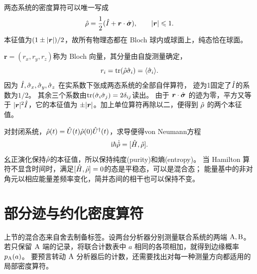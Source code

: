 两态系统的密度算符可以唯一写成
\begin{equation}
    \hat{\rho} = \frac12(\hat{I} + \bm r \cdot \hat{\bm{\sigma}}),\qquad \lvert\bm r\rvert \leqslant 1.
\end{equation}
本征值为$(1 \pm \lvert\bm r\rvert)/2$，故所有物理态都在 Bloch 球内或球面上，纯态恰在球面。

$\bm r = (r_x,r_y,r_z)$称为 Bloch 向量，其分量由自旋测量确定，
\begin{equation}
    r_i = \operatorname{tr}(\hat{\rho}\hat{\sigma}_i) = \langle\hat{\sigma}_i\rangle.
\end{equation}
因为 $\hat{I},\hat{\sigma}_x,\hat{\sigma}_y,\hat{\sigma}_z$ 在实系数下张成两态系统的全部自伴算符，
迹为1固定了$\hat{I}$的系数为$1/2$。
其余三个系数由$\operatorname{tr}(\hat{\sigma}_i\hat{\sigma}_j) = 2\delta_{ij}$读出。
由于 $\bm r \cdot \hat{\bm{\sigma}}$ 的迹为零，平方又等于 $\lvert\bm r\rvert^2\hat{I}$，它的本征值为 $\pm\lvert\bm r\rvert$。加上单位算符再除以二，便得到 $\hat{\rho}$ 的两个本征值。

对封闭系统，$\hat{\rho}(t) = \hat{U}(t)\hat{\rho}(0)\hat{U}^\dagger(t)$，求导便得von Neumann方程
\begin{equation}
    \mathrm{i}\hbar\dot{\hat{\rho}} = [\hat{H},\hat{\rho}].
\end{equation}
幺正演化保持$\hat{\rho}$的本征值，所以保持纯度(purity)和熵(entropy)。
当 Hamilton 算符不显含时间时，满足$[\hat{H},\hat{\rho}] = 0$的态是平稳态，可以是混合态；
能量基中的非对角元以相应能量差频率变化，简并态间的相干也可以保持不变。

\section{部分迹与约化密度算符}
上节的混合态来自舍去制备标签。设两台分析器分别测量联合系统的两端 $\mathrm{A},\mathrm{B}$。
若只保留 $\mathrm{A}$ 端的记录，将联合计数表中 $a$ 相同的各项相加，就得到边缘概率 $p_{\mathrm{A}}(a)$。
要预言转动 $\mathrm{A}$ 分析器后的计数，还需要找出对每一种测量方向都适用的局部密度算符。


